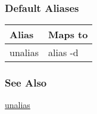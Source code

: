 \subsubsection*{Default Aliases}
\begin{tabular}{|l|l|}
\hline 
 Alias  & Maps to  \\
 \hline 
 unalias  & alias -d  \\
 \hline 
\end{tabular}
\subsubsection*{See Also}
\hyperref[unalias]{unalias} 